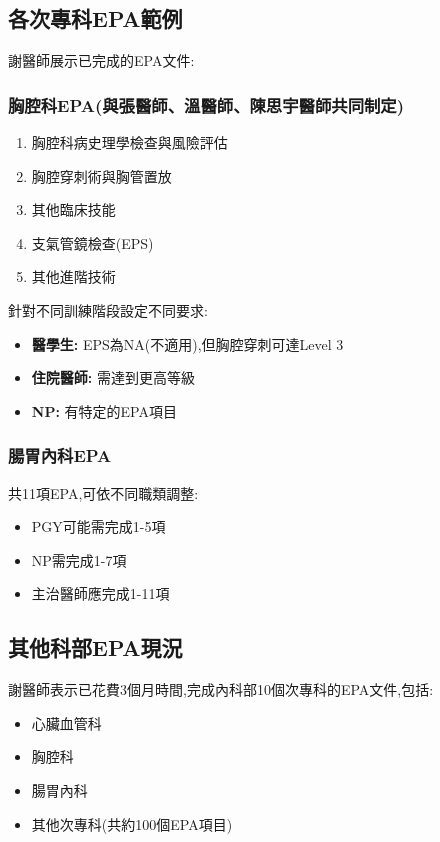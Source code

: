 \documentclass[12pt,a4paper]{article}
\begin{document}
\subsection{各次專科EPA範例}

謝醫師展示已完成的EPA文件:

\subsubsection{胸腔科EPA(與張醫師、溫醫師、陳思宇醫師共同制定)}

\begin{enumerate}[leftmargin=*]
    \item 胸腔科病史理學檢查與風險評估
    \item 胸腔穿刺術與胸管置放
    \item 其他臨床技能
    \item 支氣管鏡檢查(EPS)
    \item 其他進階技術
\end{enumerate}

針對不同訓練階段設定不同要求:
\begin{itemize}[leftmargin=*]
    \item \textbf{醫學生:} EPS為NA(不適用),但胸腔穿刺可達Level 3
    \item \textbf{住院醫師:} 需達到更高等級
    \item \textbf{NP:} 有特定的EPA項目
\end{itemize}

\subsubsection{腸胃內科EPA}

共11項EPA,可依不同職類調整:
\begin{itemize}[leftmargin=*]
    \item PGY可能需完成1-5項
    \item NP需完成1-7項  
    \item 主治醫師應完成1-11項
\end{itemize}

\subsection{其他科部EPA現況}

謝醫師表示已花費3個月時間,完成內科部10個次專科的EPA文件,包括:
\begin{itemize}[leftmargin=*]
    \item 心臟血管科
    \item 胸腔科
    \item 腸胃內科
    \item 其他次專科(共約100個EPA項目)
\end{itemize}
\end{document}

